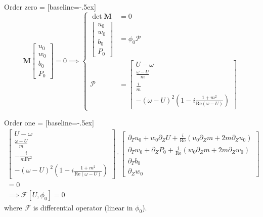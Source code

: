 \documentclass[10pt]{beamer}
\begin{document}
\begin{frame}[fragile]{Order zero}
   = [baseline=-.5ex]
  \begin{equation*}\!\!\!\!\!
  	\mathbf{M}
  	\begin{bmatrix}
  		u_{0}\\
  		w_{0}\\
  		b_{0}\\
  		P_{0}
  	\end{bmatrix}
  	=0 \implies 
  	\begin{cases}
  		\det{\mathbf{M}}&=0\\
  		\begin{bmatrix}
  			u_{0}\\
  			w_{0}\\
  			b_{0}\\
  			P_{0}
  		\end{bmatrix}&
  		=\phi_{0}\boldsymbol{\mathcal{P}}\\
  		\boldsymbol{\mathcal{P}}&=
  		\begin{bmatrix}
  			U-\omega\\
  			\frac{\omega-U}{m}\\
  			\frac{i}{m}\\
  			-\left(\omega-U\right)^{2}\left(1-i\frac{1+m^{2}}{\mathrm{Re}\left(\omega-U\right)}\right)
  		\end{bmatrix}
  	\end{cases}
  \end{equation*}
\end{frame}

\begin{frame}[fragile]{Order one}
   = [baseline=-.5ex]
  \begin{align*}\!\!\!\!\!\!\!\!\!\!
  	\begin{bmatrix}
  		U-\omega\\
  		\frac{\omega-U}{m}\\
  		-\frac{i}{m\mathrm{Fr}^{2}}\\
  		-\left(\omega-U\right)^{2}\left(1-i\frac{1+m^{2}}{\mathrm{Re}\left(\omega-U\right)}\right)
  	\end{bmatrix}
  		\cdot
  	\begin{bmatrix}
  		\partial_{T}u_{0}+w_{0}\partial_{Z}U+\frac{i}{\mathrm{Re}}\left(u_{0}\partial_{Z}m+2m\partial_{Z}u_{0} \right)\\
  		\partial_{T}w_{0}+\partial_{Z}P_{0}+\frac{i}{\mathrm{Re}}\left(w_{0}\partial_{Z}m+2m\partial_{Z}w_{0} \right)\\
  		\partial_{T}b_{0}\\
  		\partial_{Z}w_{0}
  	\end{bmatrix}\\
  	=0\\
  	\implies \mathcal{F}\left[U,\phi_{0} \right]=0\;\;\;\;\;\;\;\;\;\;\;\;\;\;\;\;\;\;\;\;\;\;\;\;\;\;\;\;\;\;\;\;\;\;\;\;\;\;\;\;\;\;\;\;\;\;\;\;\;\;\;
  \end{align*}
  where $\mathcal{F}$ is differential operator (linear in $\phi_{0}$).
\end{frame}
\end{document}
